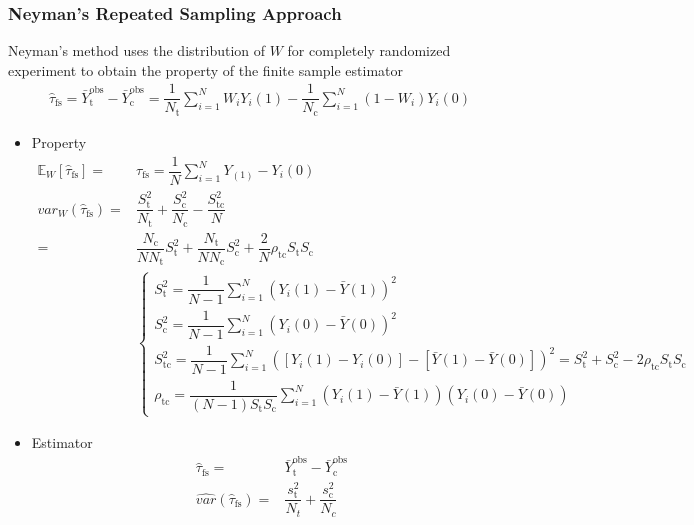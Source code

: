    
\subsubsection{Neyman's Repeated Sampling Approach}

Neyman's method uses the distribution of $ W $ for completely randomized experiment to obtain the property of the finite sample estimator
\begin{align}
    \hat{\tau}_\mathrm{fs}=\bar{Y}_\mathrm{t}^\mathrm{obs}-\bar{Y}_\mathrm{c}^\mathrm{obs}= \dfrac{1}{N_\mathrm{t} }\sum_{i=1}^N W_iY_i(1)-\dfrac{1}{N_\mathrm{c} } \sum_{i=1}^N(1-W_i)Y_i(0)   
\end{align}

\begin{itemize}[topsep=2pt,itemsep=0pt]
    \item Property
    \begin{align}
        \mathbb{E}_W\left[ \hat{\tau}_\mathrm{fs}  \right] = & \tau_\mathrm{fs}=\dfrac{1}{N}\sum_{i=1}^NY_(1)-Y_i(0) \\
        var_W(\hat{\tau}_\mathrm{fs} )=&\dfrac{S_\mathrm{t} ^2}{N_\mathrm{t} }+\dfrac{S_\mathrm{c} ^2}{N_\mathrm{c} }-\dfrac{S^2_{\mathrm{tc} }}{N}\\
        =&\dfrac{N_\mathrm{c} }{NN_\mathrm{t} }S_\mathrm{t} ^2+\dfrac{N_\mathrm{t} }{NN_\mathrm{c} }S_\mathrm{c}^2+\dfrac{2}{N}\rho _{\mathrm{tc} }S_\mathrm{t}S_\mathrm{c}    \\
        &\begin{cases}
            S_\mathrm{t}^2=\dfrac{1}{N-1}\sum_{i=1}^N(Y_i(1)-\bar{Y}(1))^2\\
            S_\mathrm{c}^2=\dfrac{1}{N-1}\sum_{i=1}^N(Y_i(0)-\bar{Y}(0))^2\\
            S_\mathrm{tc}^2=\dfrac{1}{N-1}\sum_{i=1}^N\left([Y_i(1)-Y_i(0)]-[\bar{Y}(1)-\bar{Y}(0)]\right)^2=S_\mathrm{t}^2+S_\mathrm{c}^2-2\rho _\mathrm{tc}S_\mathrm{t}S_{\mathrm{c} }    \\
            \rho _\mathrm{tc}=\dfrac{1}{(N-1)S_\mathrm{t}S_{\mathrm{c} } }\sum_{i=1}^N\left(Y_i(1)-\bar{Y}(1)\right)\left(Y_i(0)-\bar{Y}(0)\right) 
        \end{cases}
    \end{align}
    \item Estimator
    \begin{align}
        \hat{\tau}_\mathrm{fs}= & \bar{Y}_\mathrm{t}^\mathrm{obs}-\bar{Y}_\mathrm{c}^\mathrm{obs}\\
        \hat{var}(\hat{\tau}_\mathrm{fs} )=&\dfrac{s^2_\mathrm{t} }{N_t}+\dfrac{s^2_\mathrm{c} }{N_c}\\

\end{align}
\end{itemize}
